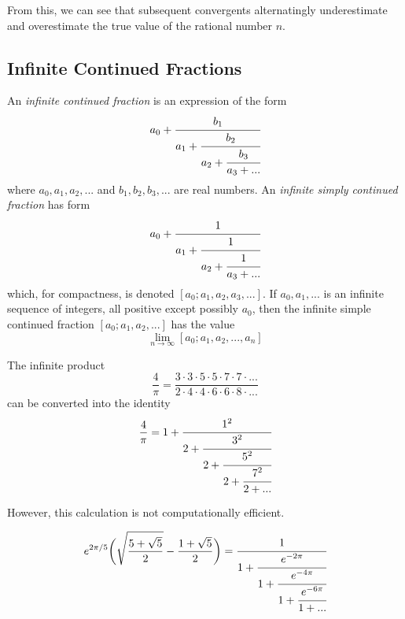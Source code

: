\documentclass{article}
\newcounter{theorem}[section]
\newcounter{definition}[section]
\begin{document}
From this, we can see that subsequent convergents alternatingly underestimate and overestimate the true value of the rational number $n$. 


\subsection{Infinite Continued Fractions}

\begin{definition}
  \label{def:infinite-continued-fraction}
An \textit{infinite continued fraction} is an expression of the form 
\begin{equation}
  a_0 + \cfrac{b_1}{a_1 + \cfrac{b_2}{a_2 + \cfrac{b_3}{a_3 + ...}}}
\end{equation}
where $a_0, a_1, a_2, ...$ and $b_1, b_2, b_3, ...$ are real numbers. An \textit{infinite simply continued fraction} has form 
\begin{equation}
  a_0 + \cfrac{1}{a_1 + \cfrac{1}{a_2 + \cfrac{1}{a_3 + ...}}}
\end{equation}
which, for compactness, is denoted $[a_0;a_1, a_2, a_3, ...]$. If $a_0, a_1, ...$ is an infinite sequence of integers, all positive except possibly $a_0$, then the infinite simple continued fraction $[a_0; a_1, a_2, ...]$ has the value 
\begin{equation}
  \lim_{n \rightarrow \infty} [a_0 ; a_1, a_2, ..., a_n]
\end{equation}
\end{definition}

\begin{theorem}[Brouncker]
  \label{thm:brouncker}
The infinite product 
\begin{equation}
  \frac{4}{\pi} = \frac{3 \cdot 3 \cdot 5 \cdot 5 \cdot 7 \cdot 7 \cdot ...}{2 \cdot 4 \cdot 4 \cdot 6 \cdot 6 \cdot 8 \cdot ...}
\end{equation}
can be converted into the identity
\begin{equation}
  \frac{4}{\pi} = 1 + \cfrac{1^2}{2 + \cfrac{3^2}{2 + \cfrac{5^2} {2+\cfrac{7^2}{2+...}}}}
\end{equation}
\end{theorem}
However, this calculation is not computationally efficient. 

\begin{theorem}[Ramanujan]
  \label{thm:ramanujan-3}
\begin{equation}
  e^{2\pi/5} \bigg( \sqrt{\frac{5+\sqrt{5}}{2}} - \frac{1+\sqrt{5}}{2} \bigg) = \cfrac{1}{1 + \cfrac{e^{-2\pi}}{1+\cfrac{e^{-4\pi}}{1+\cfrac{e^{-6\pi}}{1+...}}}}
\end{equation}
\end{theorem}
\end{document}
